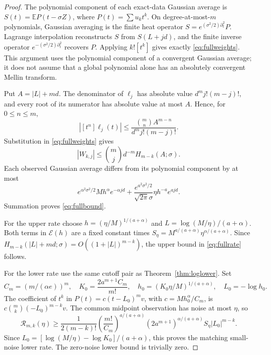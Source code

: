 \begin{proof}
The polynomial component of each exact-data Gaussian average is
$S(t)=\mathbb E P(t-\sigma Z)$, where $P(t)=\sum u_kt^k$.
On degree-at-most-$m$ polynomials, Gaussian averaging is the finite
heat operator $S=e^{(\sigma^2/2)\partial_t^2}P$.
Lagrange interpolation reconstructs $S$ from $S(L+jd)$, and the
finite inverse operator $e^{-(\sigma^2/2)\partial_t^2}$ recovers $P$.
Applying $k![t^k]$ gives exactly \eqref{eq:fullweights}.
This argument uses the polynomial component of a convergent Gaussian
average; it does not assume that a global polynomial alone has an
absolutely convergent Mellin transform.

Put $A=|L|+md$. The denominator of $\ell_j$ has absolute value
$d^m j!(m-j)!$, and every root of its numerator has absolute value
at most $A$. Hence, for $0\le n\le m$,
\[
 |[t^n]\ell_j(t)|\le
 \frac{\binom mn A^{m-n}}{d^m j!(m-j)!}.
\]
Substitution in \eqref{eq:fullweights} gives
\[
 |W_{k,j}|\le\binom mj d^{-m}H_{m-k}(A;\sigma).
\]
Each observed Gaussian average differs from its polynomial component
by at most
\[
 e^{\alpha^2\sigma^2/2}Mh^\alpha e^{-\alpha jd}
 +\frac{e^{a^2\sigma^2/2}}{\sqrt{2\pi}\sigma}
 \eta h^{-a}e^{ajd}.
\]
Summation proves \eqref{eq:fullbound}.

For the upper rate choose
$h=(\eta/M)^{1/(a+\alpha)}$ and
$L=\log(M/\eta)/(a+\alpha)$.
Both terms in $\mathcal E(h)$ are a fixed constant times
$S_\eta=M^{a/(a+\alpha)}\eta^{\alpha/(a+\alpha)}$.
Since $H_{m-k}(|L|+md;\sigma)=O((1+|L|)^{m-k})$, the upper
bound in \eqref{eq:fullrate} follows.

For the lower rate use the same cutoff pair as
Theorem~\ref{thm:loglower}. Set
\[
 C_m=(m/(\alpha e))^m,\quad
 K_0=\frac{2a^{m+1}C_m}{m!},\quad
 h_0=(K_0\eta/M)^{1/(a+\alpha)},\quad L_0=-\log h_0.
\]
The coefficient of $t^k$ in
$P(t)=c(t-L_0)^m v$, with $c=Mh_0^\alpha/C_m$, is
$c\binom mk(-L_0)^{m-k}v$.
The common midpoint observation has noise at most $\eta$, so
\begin{equation}\label{eq:fulllower}
 \mathcal R_{m,k}(\eta)\ge
 \frac{1}{2(m-k)!}
 \left(\frac{m!}{C_m}\right)^{a/(a+\alpha)}
 (2a^{m+1})^{\alpha/(a+\alpha)}S_\eta |L_0|^{m-k}.
\end{equation}
Since $L_0=[\log(M/\eta)-\log K_0]/(a+\alpha)$, this proves
the matching small-noise lower rate. The zero-noise lower bound
is trivially zero.
\end{proof}

